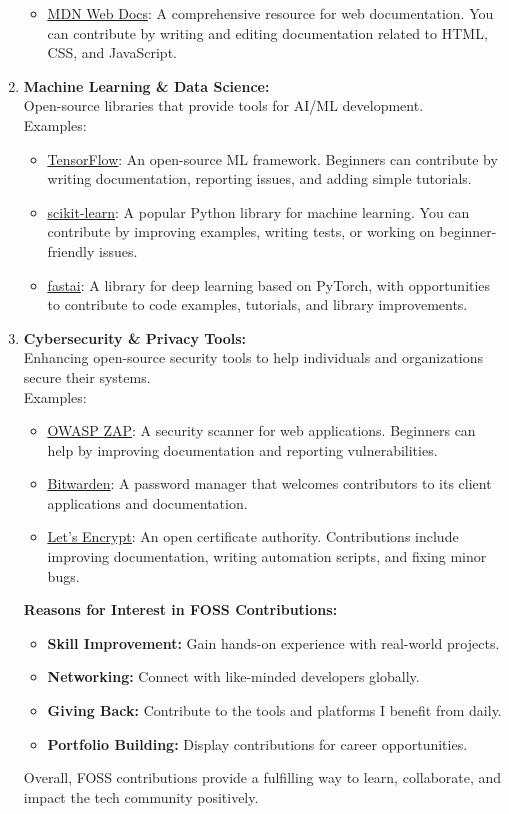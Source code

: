 \documentclass[titlepage]{article}
\begin{document}
\begin{enumerate}
\begin{itemize}
  \item \href{https://github.com/mdn/content}{\underline{MDN Web Docs}}: A comprehensive resource for web documentation. You can contribute by writing and editing documentation related to HTML, CSS, and JavaScript.
\end{itemize}
\item \textbf{Machine Learning \& Data Science:}
\\Open-source libraries that provide tools for AI/ML development.  
\\Examples:
\begin{itemize}
  \item \href{https://github.com/tensorflow/tensorflow}{\underline{TensorFlow}}: An open-source ML framework. Beginners can contribute by writing documentation, reporting issues, and adding simple tutorials.
  \item \href{https://github.com/scikit-learn/scikit-learn}{\underline{scikit-learn}}: A popular Python library for machine learning. You can contribute by improving examples, writing tests, or working on beginner-friendly issues.
  \item \href{https://github.com/fastai/fastai}{\underline{fastai}}: A library for deep learning based on PyTorch, with opportunities to contribute to code examples, tutorials, and library improvements.
\end{itemize} 
\item \textbf{Cybersecurity \& Privacy Tools:} 
\\Enhancing open-source security tools to help individuals and organizations secure their systems.  
\\Examples: 
\begin{itemize}
  \item \href{https://github.com/zaproxy/zaproxy}{\underline{OWASP ZAP}}: A security scanner for web applications. Beginners can help by improving documentation and reporting vulnerabilities.
  \item \href{https://github.com/bitwarden/clients}{\underline{Bitwarden}}: A password manager that welcomes contributors to its client applications and documentation.
  \item \href{https://github.com/letsencrypt/boulder}{\underline{Let's Encrypt}}: An open certificate authority. Contributions include improving documentation, writing automation scripts, and fixing minor bugs.
\end{itemize} 
\textbf{Reasons for Interest in FOSS Contributions:}  
\begin{itemize}
  \item \textbf{Skill Improvement:} Gain hands-on experience with real-world projects.
  \item \textbf{Networking:} Connect with like-minded developers globally.
  \item \textbf{Giving Back:} Contribute to the tools and platforms I benefit from daily.
  \item \textbf{Portfolio Building:} Display contributions for career opportunities.
\end{itemize}
Overall, FOSS contributions provide a fulfilling way to learn, collaborate, and impact the tech community positively.
\end{enumerate}
\end{document}
